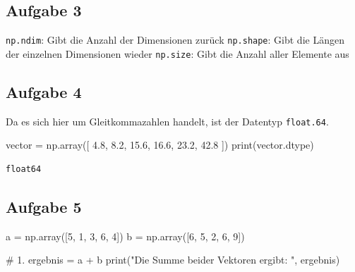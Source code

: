 \documentclass[
  letterpaper,
  DIV=11,
  numbers=noendperiod]{scrreprt}
\newenvironment{Shaded}{\begin{snugshade}}{\end{snugshade}}
\newcommand{\BuiltInTok}[1]{\textcolor[rgb]{0.00,0.23,0.31}{#1}}
\newcommand{\CommentTok}[1]{\textcolor[rgb]{0.37,0.37,0.37}{#1}}
\newcommand{\DecValTok}[1]{\textcolor[rgb]{0.68,0.00,0.00}{#1}}
\newcommand{\FloatTok}[1]{\textcolor[rgb]{0.68,0.00,0.00}{#1}}
\newcommand{\NormalTok}[1]{\textcolor[rgb]{0.00,0.23,0.31}{#1}}
\newcommand{\OperatorTok}[1]{\textcolor[rgb]{0.37,0.37,0.37}{#1}}
\newcommand{\StringTok}[1]{\textcolor[rgb]{0.13,0.47,0.30}{#1}}
\begin{document}
\begin{tcolorbox}
\subsection*{Aufgabe 3}\label{aufgabe-3-1}

\texttt{np.ndim}: Gibt die Anzahl der Dimensionen zurück
\texttt{np.shape}: Gibt die Längen der einzelnen Dimensionen wieder
\texttt{np.size}: Gibt die Anzahl aller Elemente aus

\subsection*{Aufgabe 4}\label{aufgabe-4-1}

Da es sich hier um Gleitkommazahlen handelt, ist der Datentyp
\texttt{float.64}.

\begin{Shaded}
\begin{Highlighting}[]
\NormalTok{vector }\OperatorTok{=}\NormalTok{ np.array([ }\FloatTok{4.8}\NormalTok{,  }\FloatTok{8.2}\NormalTok{, }\FloatTok{15.6}\NormalTok{, }\FloatTok{16.6}\NormalTok{, }\FloatTok{23.2}\NormalTok{, }\FloatTok{42.8}\NormalTok{ ])}
\BuiltInTok{print}\NormalTok{(vector.dtype)}
\end{Highlighting}
\end{Shaded}

\begin{verbatim}
float64
\end{verbatim}

\subsection*{Aufgabe 5}\label{aufgabe-5-1}

\begin{Shaded}
\begin{Highlighting}[]
\NormalTok{a }\OperatorTok{=}\NormalTok{ np.array([}\DecValTok{5}\NormalTok{, }\DecValTok{1}\NormalTok{, }\DecValTok{3}\NormalTok{, }\DecValTok{6}\NormalTok{, }\DecValTok{4}\NormalTok{])}
\NormalTok{b }\OperatorTok{=}\NormalTok{ np.array([}\DecValTok{6}\NormalTok{, }\DecValTok{5}\NormalTok{, }\DecValTok{2}\NormalTok{, }\DecValTok{6}\NormalTok{, }\DecValTok{9}\NormalTok{])}

\CommentTok{\# 1.}
\NormalTok{ergebnis }\OperatorTok{=}\NormalTok{ a }\OperatorTok{+}\NormalTok{ b}
\BuiltInTok{print}\NormalTok{(}\StringTok{"Die Summe beider Vektoren ergibt: "}\NormalTok{, ergebnis) }


\end{Highlighting}
\end{Shaded}
\end{tcolorbox}
\end{document}
